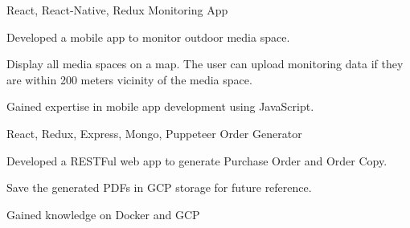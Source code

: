 

\begin{cventries}


  \cventry
  {React, React-Native, Redux} %
  {Monitoring App} %
  {} %
  {} %
  {
    \begin{cvitems} %
      \item {Developed a mobile app to monitor outdoor media space.}
      \item {Display all media spaces on a map. The user can upload monitoring data if they are within 200 meters vicinity of the media space.}
      \item {Gained expertise in mobile app development using JavaScript.}
    \end{cvitems}
  }


  \cventry
  {React, Redux, Express, Mongo, Puppeteer} %
  {Order Generator} %
  {} %
  {} %
  {
    \begin{cvitems} %
      \item {Developed a RESTFul web app to generate Purchase Order and Order Copy.}
      \item {Save the generated PDFs in GCP storage for future reference.}
      \item {Gained knowledge on Docker and GCP}
    \end{cvitems}
  }

\end{cventries}
